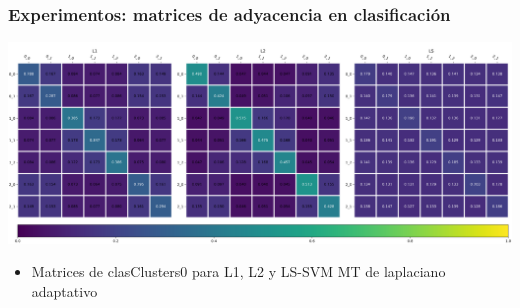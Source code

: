 \documentclass[aspectratio=43,spanish]{beamer}
\newcommand{\fdata}[1]{\textsf{#1}}
\begin{document}
\begin{frame}
\end{frame}



\begin{frame}
      \frametitle{Experimentos: matrices de adyacencia en clasificación}
      \centering
      \includegraphics[width=.95\textwidth]{Chapter6/IGPL2022/adjMatrix_all__clasClusters_0_crop.pdf}

      \begin{itemize}
            \item Matrices de \fdata{clasClusters0} para L1, L2 y LS-SVM MT de laplaciano adaptativo
      \end{itemize}      

\end{frame}


\end{document}
